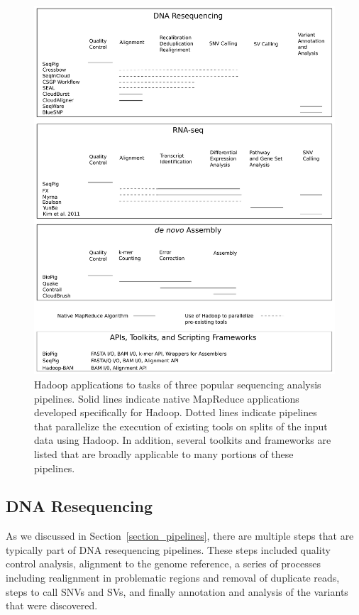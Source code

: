 \begin{figure}
\centering
\includegraphics[width=1\textwidth]{figures/bio_hadoop_ecosystem.pdf}
\caption{Hadoop applications to tasks of three popular sequencing analysis pipelines. Solid lines indicate native MapReduce applications developed specifically for Hadoop. Dotted lines indicate pipelines that parallelize the execution of existing tools on splits of the input data using Hadoop. In addition, several toolkits and frameworks are listed that are broadly applicable to many portions of these pipelines.}
\label{bio_hadoop_ecosystem}
\end{figure}

\subsection{DNA Resequencing}

As we discussed in Section~\ref{section_pipelines}, there are multiple steps that are typically part of DNA resequencing pipelines. These steps included quality control analysis, alignment to the genome reference, a series of processes including realignment in problematic regions and removal of duplicate reads, steps to call SNVs and SVs, and finally annotation and analysis of the variants that were discovered. 

